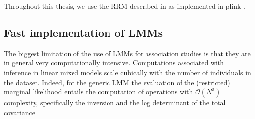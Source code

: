Throughout this thesis, we use the RRM described in \cite{yang2011gcta} as implemented in plink \cite{purcell2007plink}.







\subsection{Fast implementation of LMMs}

The biggest limitation of the use of LMMs for association studies is that they are in general very computationally intensive.
Computations associated with inference in linear mixed models scale cubically with
the number of individuals in the dataset. 
Indeed, for the generic LMM
the evaluation of the (restricted) marginal likelihood entails the computation of operations with $\mathcal{O}(N^3)$ complexity, specifically the inversion and the log determinant of the total covariance.%


